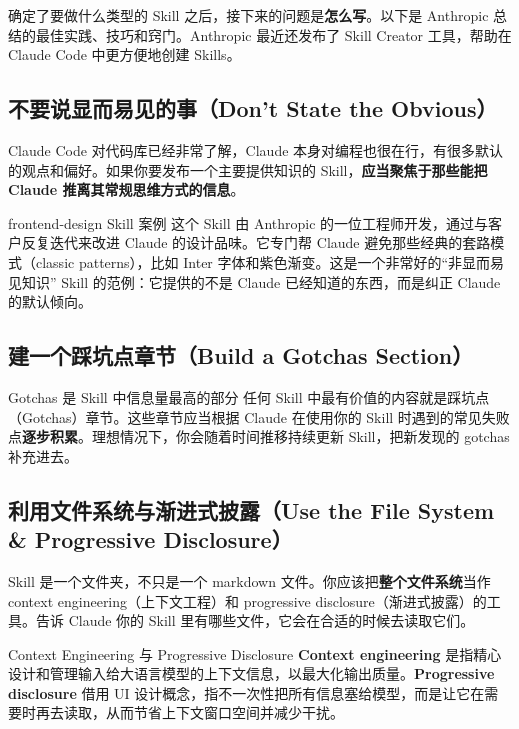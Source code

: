 \documentclass[a4paper]{article}
\begin{document}
确定了要做什么类型的 Skill 之后，接下来的问题是\textbf{怎么写}。以下是 Anthropic 总结的最佳实践、技巧和窍门。Anthropic 最近还发布了 Skill Creator 工具，帮助在 Claude Code 中更方便地创建 Skills。

\subsection{不要说显而易见的事（Don't State the Obvious）}

Claude Code 对代码库已经非常了解，Claude 本身对编程也很在行，有很多默认的观点和偏好。如果你要发布一个主要提供知识的 Skill，\textbf{应当聚焦于那些能把 Claude 推离其常规思维方式的信息}。

\begin{knowledgebox}{frontend-design Skill 案例}
这个 Skill 由 Anthropic 的一位工程师开发，通过与客户反复迭代来改进 Claude 的设计品味。它专门帮 Claude 避免那些经典的套路模式（classic patterns），比如 Inter 字体和紫色渐变。这是一个非常好的``非显而易见知识'' Skill 的范例：它提供的不是 Claude 已经知道的东西，而是纠正 Claude 的默认倾向。
\end{knowledgebox}

\subsection{建一个踩坑点章节（Build a Gotchas Section）}

\begin{importantbox}{Gotchas 是 Skill 中信息量最高的部分}
任何 Skill 中最有价值的内容就是踩坑点（Gotchas）章节。这些章节应当根据 Claude 在使用你的 Skill 时遇到的常见失败点\textbf{逐步积累}。理想情况下，你会随着时间推移持续更新 Skill，把新发现的 gotchas 补充进去。
\end{importantbox}

\subsection{利用文件系统与渐进式披露（Use the File System \& Progressive Disclosure）}

Skill 是一个文件夹，不只是一个 markdown 文件。你应该把\textbf{整个文件系统}当作 context engineering（上下文工程）和 progressive disclosure（渐进式披露）的工具。告诉 Claude 你的 Skill 里有哪些文件，它会在合适的时候去读取它们。

\begin{knowledgebox}{Context Engineering 与 Progressive Disclosure}
\textbf{Context engineering} 是指精心设计和管理输入给大语言模型的上下文信息，以最大化输出质量。\textbf{Progressive disclosure} 借用 UI 设计概念，指不一次性把所有信息塞给模型，而是让它在需要时再去读取，从而节省上下文窗口空间并减少干扰。
\end{knowledgebox}
\end{document}
